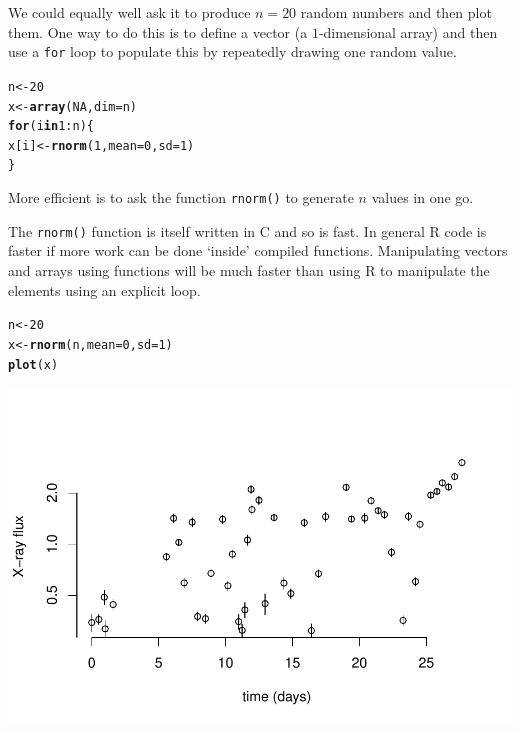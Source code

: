 \documentclass[a4paper,11pt]{article}\usepackage[]{graphicx}\usepackage[]{color}
\makeatletter
\def\maxwidth{ %
  \ifdim\Gin@nat@width>\linewidth
    \linewidth
  \else
    \Gin@nat@width
  \fi
}
\newcommand{\hlnum}[1]{\textcolor[rgb]{0.686,0.059,0.569}{#1}}%
\newcommand{\hlopt}[1]{\textcolor[rgb]{0,0,0}{#1}}%
\newcommand{\hlstd}[1]{\textcolor[rgb]{0.345,0.345,0.345}{#1}}%
\newcommand{\hlkwa}[1]{\textcolor[rgb]{0.161,0.373,0.58}{\textbf{#1}}}%
\newcommand{\hlkwb}[1]{\textcolor[rgb]{0.69,0.353,0.396}{#1}}%
\newcommand{\hlkwc}[1]{\textcolor[rgb]{0.333,0.667,0.333}{#1}}%
\newcommand{\hlkwd}[1]{\textcolor[rgb]{0.737,0.353,0.396}{\textbf{#1}}}%
\newenvironment{kframe}{%
 \def\at@end@of@kframe{}%
 \ifinner\ifhmode%
  \def\at@end@of@kframe{\end{minipage}}%
  \begin{minipage}{\columnwidth}%
 \fi\fi%
 \def\FrameCommand##1{\hskip\@totalleftmargin \hskip-\fboxsep
 \colorbox{shadecolor}{##1}\hskip-\fboxsep
     \hskip-\linewidth \hskip-\@totalleftmargin \hskip\columnwidth}%
 \MakeFramed {\advance\hsize-\width
   \@totalleftmargin\z@ \linewidth\hsize
   \@setminipage}}%
 {\par\unskip\endMakeFramed%
 \at@end@of@kframe}
\newenvironment{knitrout}{}{} %
\makeatother
\begin{document}
We could equally well ask it to produce $n=20$ random numbers and then plot them. One way to do this is to define a vector (a $1$-dimensional array) and then use a {\tt for} loop to populate this by repeatedly drawing one random value.

\begin{knitrout}
\color{fgcolor}\begin{kframe}
\begin{alltt}
    \hlstd{n} \hlkwb{<-} \hlnum{20}
    \hlstd{x} \hlkwb{<-} \hlkwd{array}\hlstd{(}\hlnum{NA}\hlstd{,} \hlkwc{dim} \hlstd{= n)}
    \hlkwa{for} \hlstd{(i} \hlkwa{in} \hlnum{1}\hlopt{:}\hlstd{n) \{}
      \hlstd{x[i]} \hlkwb{<-} \hlkwd{rnorm}\hlstd{(}\hlnum{1}\hlstd{,} \hlkwc{mean} \hlstd{=} \hlnum{0}\hlstd{,} \hlkwc{sd} \hlstd{=} \hlnum{1}\hlstd{)}
    \hlstd{\}}
\end{alltt}
\end{kframe}
\end{knitrout}

More efficient is to ask the function {\tt rnorm()} to generate $n$ values in one go. 

The {\tt rnorm()} function is itself written in C and so is fast. In general R code is faster if more work can be done `inside' compiled functions. Manipulating vectors and arrays using functions will be much faster than using R to manipulate the elements using an explicit loop.

\begin{knitrout}
\color{fgcolor}\begin{kframe}
\begin{alltt}
  \hlstd{n} \hlkwb{<-} \hlnum{20}
  \hlstd{x} \hlkwb{<-} \hlkwd{rnorm}\hlstd{(n,} \hlkwc{mean} \hlstd{=} \hlnum{0}\hlstd{,} \hlkwc{sd} \hlstd{=} \hlnum{1}\hlstd{)}
  \hlkwd{plot}\hlstd{(x)}
\end{alltt}
\end{kframe}

{\centering \includegraphics[width=\maxwidth]{figure/unnamed-chunk-3-1} 

}



\end{knitrout}
\end{document}
